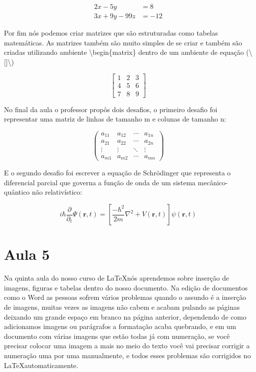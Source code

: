 \begin{align}
    2x - 5y &= 8 \\
    3x + 9y - 99z &= -12
\end{align}

Por fim nós podemos criar matrizes que são estruturadas como tabelas matemáticas. As matrizes também são muito simples de se criar e também são criadas utilizando ambiente \textbackslash begin\{matrix\} dentro de um ambiente de equação (\textbackslash[]\textbackslash)

\[\begin{bmatrix} 1 & 2 & 3 \\ 4 & 5 & 6 \\ 7 & 8 & 9 \end{bmatrix}\]


No final da aula o professor propôs dois desafios, o primeiro desafio foi representar uma matriz de linhas de tamanho m e colunas de tamanho n:

\[\begin{pmatrix}
    a_{11} & a_{12} & \cdots & a_{1n}\\
    a_{21} & a_{22} & \cdots & a_{2n}\\
    \vdots & \vdots & \ddots & \vdots\\
    a_{m1} & a_{m2} & \cdots & a_{mn}
\end{pmatrix}\]

E o segundo desafio foi escrever a equação de Schrödinger que representa o diferencial parcial que governa a função de onda de um sistema mecânico-quântico não relativístico:

\[
    i\hbar \frac{\partial}{\partial_t} \Psi (\mathbf{r}, t) = \left[ \frac{-\hbar^2}{2m} \nabla^2 + V(\mathbf{r}, t) \right] \psi (\mathbf{r}, t)
\]

\section{Aula 5}

Na quinta aula do nosso curso de \LaTeX nós aprendemos sobre inserção de imagens, figuras e tabelas dentro do nosso documento. Na edição de documentos como o Word as pessoas sofrem vários problemas quando o assundo é a inserção de imagens, muitas vezes as imagens não cabem e acabam pulando as páginas deixando um grande espaço em branco na página anterior, dependendo de como adicionamos imagens ou parágrafos a formatação acaba quebrando, e em um documento com várias imagens que estão todas já com numeração, se você precisar colocar uma imagem a mais no meio do texto você vai precisar corrigir a numeração uma por uma manualmente, e todos esses problemas são corrigidos no \LaTeX automaticamente.

